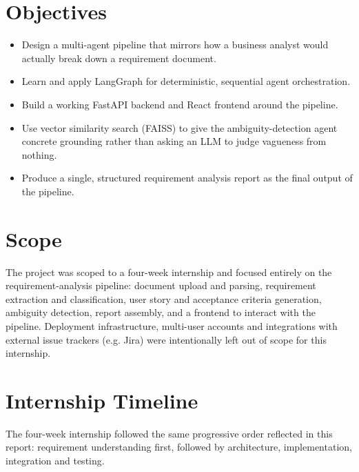 \documentclass[12pt,a4paper,openany]{report}
\begin{document}
\section{Objectives}
\begin{itemize}[leftmargin=*]
\item Design a multi-agent pipeline that mirrors how a business analyst
  would actually break down a requirement document.
\item Learn and apply LangGraph for deterministic, sequential agent
  orchestration.
\item Build a working FastAPI backend and React frontend around the
  pipeline.
\item Use vector similarity search (FAISS) to give the ambiguity-detection
  agent concrete grounding rather than asking an LLM to judge vagueness
  from nothing.
\item Produce a single, structured requirement analysis report as the
  final output of the pipeline.
\end{itemize}

\section{Scope}
The project was scoped to a four-week internship and focused entirely on
the requirement-analysis pipeline: document upload and parsing, requirement
extraction and classification, user story and acceptance criteria
generation, ambiguity detection, report assembly, and a frontend to
interact with the pipeline. Deployment infrastructure, multi-user
accounts and integrations with external issue trackers (e.g. Jira) were
intentionally left out of scope for this internship.

\section{Internship Timeline}
The four-week internship followed the same progressive order reflected in this
report: requirement understanding first, followed by architecture,
implementation, integration and testing.
\end{document}
